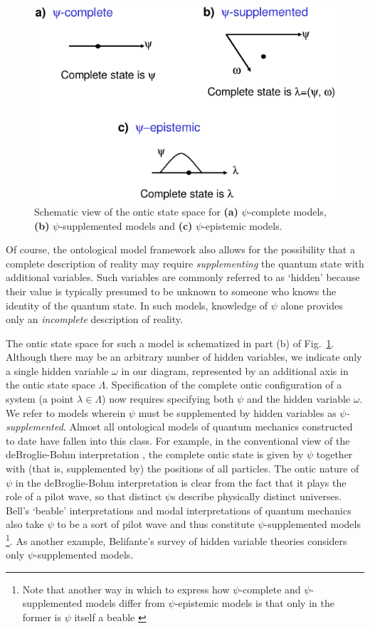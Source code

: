 \documentclass[aps,nofootinbib,12pt]{revtex4}
\begin{document}
\begin{figure}[t]
\includegraphics[scale=0.4]{classes}\caption{Schematic view of the ontic state
space for \textbf{(a)} $\psi$-complete models, \textbf{(b)}
$\psi$-supplemented
models and \textbf{(c)} $\psi$-epistemic models.}%
\label{FIG:classes}%
\end{figure}


Of course, the ontological model framework also allows for the
possibility that a complete description of reality may require
\textit{supplementing} the quantum state with additional variables.
Such variables are commonly referred to as `hidden' because their
value is typically presumed to be unknown to someone who knows the
identity of the quantum state. In such models, knowledge of $\psi$
alone provides only an \textit{incomplete} description of reality.

The ontic state space for such a model is schematized in part (b) of
Fig.~\ref{FIG:classes}. Although there may be an arbitrary number of
hidden variables, we indicate only a single hidden variable $\omega$
in our diagram, represented by an additional axis in the ontic state
space $\Lambda.$ Specification of the complete ontic configuration
of a system (a point $\lambda\in\Lambda$) now requires specifying
both $\psi$ and the hidden variable $\omega$. We refer to models
wherein $\psi$ must be supplemented by hidden variables as $\psi
$\emph{-supplemented}. Almost all ontological models of quantum
mechanics constructed to date have fallen into this class. For
example, in the conventional view of the deBroglie-Bohm
interpretation \cite{bohm,bohmsurvey}, the complete ontic state is
given by $\psi$ together with (that is, supplemented by) the
positions of all particles. The ontic nature of\ $\psi$ in the
deBroglie-Bohm interpretation is clear from the fact that it plays
the role of a pilot wave, so that distinct $\psi$s describe
physically distinct universes. Bell's `beable' interpretations
\cite{beables} and modal interpretations of quantum mechanics
\cite{modalrefs1,modalrefs2,modalrefs3,modalrefs4} also take $\psi$
to be a sort of pilot wave and thus constitute $\psi$-supplemented
models \footnote{Note that another way in which to express how
$\psi$-complete and $\psi$-supplemented models differ from
$\psi$-epistemic models is that only in the former is $\psi$ itself
a beable \cite{beables}}. As another example, Belifante's survey of
hidden variable theories \cite{Belifante} considers only
$\psi$-supplemented models.
\end{document}

